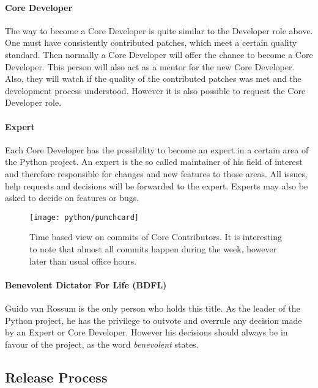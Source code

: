 \paragraph{Core Developer}

The way to become a Core Developer is quite similar to the Developer role
above. One must have consistently contributed patches, which meet a certain
quality standard. Then normally a Core Developer will offer the chance to
become a Core Developer. This person will also act as a mentor for the new Core
Developer. Also, they will watch if the quality of the contributed patches was
met and the development process understood. However it is also possible to
request the Core Developer role.

\paragraph{Expert}

Each Core Developer has the possibility to become an expert in a certain area
of the Python project. An expert is the so called maintainer of his field of
interest and therefore responsible for changes and new features to those areas.
All issues, help requests and decisions will be forwarded to the expert.
Experts may also be asked to decide on features or bugs.

\begin{figure}[hbtp]
  \centering
  \texttt{[image: python/punchcard]}
  \caption{Time based view on commits of Core Contributors. It is interesting
  to note that almost all commits happen during the week, however later than
  usual office hours.}
\end{figure}

\paragraph{Benevolent Dictator For Life (BDFL)}

Guido van Rossum is the only person who holds this title. As the leader of the
Python project, he has the privilege to outvote and overrule any decision made
by an Expert or Core Developer. However his decisions should always be in
favour of the project, as the word \emph{benevolent} states.


\subsection{Release Process} %

